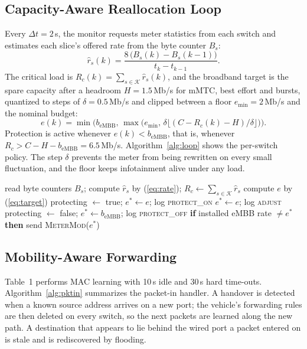 \documentclass[conference]{IEEEtran}
\begin{document}
\subsection{Capacity-Aware Reallocation Loop}
Every $\Delta t = 2$\,s, the monitor requests meter statistics from each switch and estimates each slice's offered rate from the byte counter $B_s$:
\begin{equation}
\hat r_s(k) = \frac{8\,\big(B_s(k)-B_s(k-1)\big)}{t_k - t_{k-1}} .
\label{eq:rate}
\end{equation}
The critical load is $R_c(k)=\sum_{s\in\mathcal{K}} \hat r_s(k)$, and the broadband target is the spare capacity after a headroom $H=1.5$\,Mb/s for mMTC, best effort and bursts, quantized to steps of $\delta=0.5$\,Mb/s and clipped between a floor $e_{\min}=2$\,Mb/s and the nominal budget:
\begin{equation}
e(k) = \min\!\Big(b_{\text{eMBB}},\, \max\!\big(e_{\min},\, \delta\big\lfloor (C - R_c(k) - H)/\delta \big\rfloor\big)\Big).
\label{eq:target}
\end{equation}
Protection is active whenever $e(k)<b_{\text{eMBB}}$, that is, whenever $R_c > C - H - b_{\text{eMBB}} = 6.5$\,Mb/s. Algorithm~\ref{alg:loop} shows the per-switch policy. The step $\delta$ prevents the meter from being rewritten on every small fluctuation, and the floor keeps infotainment alive under any load.

\begin{algorithm}[t]
\caption{Capacity-aware reallocation (per switch, every 2\,s)}
\label{alg:loop}
\footnotesize
\begin{algorithmic}[1]
\State read byte counters $B_s$; compute $\hat r_s$ by (\ref{eq:rate}); $R_c \gets \sum_{s\in\mathcal{K}}\hat r_s$
\State compute $e$ by (\ref{eq:target})
   \State protecting $\gets$ true; $e^\ast \gets e$; log \textsc{protect\_on}
   \State $e^\ast \gets e$; log \textsc{adjust} \EndIf
{}
  \State protecting $\gets$ false; $e^\ast \gets b_{\text{eMBB}}$; log \textsc{protect\_off}
\EndIf
\State \textbf{if} installed eMBB rate $\neq e^\ast$ \textbf{then} send \textsc{MeterMod}($e^\ast$)
\end{algorithmic}
\end{algorithm}

\subsection{Mobility-Aware Forwarding}
Table~1 performs MAC learning with 10\,s idle and 30\,s hard time-outs. Algorithm~\ref{alg:pktin} summarizes the packet-in handler. A handover is detected when a known source address arrives on a new port; the vehicle's forwarding rules are then deleted on every switch, so the next packets are learned along the new path. A destination that appears to lie behind the wired port a packet entered on is stale and is rediscovered by flooding.
\end{document}
